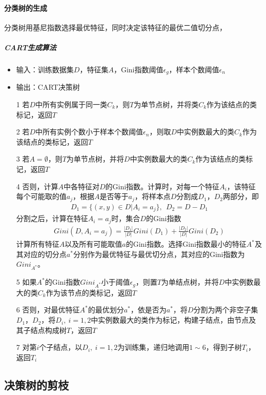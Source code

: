 \paragraph{分类树的生成}

分类树用基尼指数选择最优特征，同时决定该特征的最优二值切分点，
\subparagraph{CART生成算法}
\begin{itemize}
\item 输入：训练数据集$D$，特征集$A$，Gini指数阈值$\epsilon_g$，样本个数阈值$\epsilon_n$
\item 输出：CART决策树
\item[1] 若$D$中所有实例属于同一类$C_k$，则$T$为单节点树，并将类$C_k$作为该结点的类标记，返回$T$
\item[2] 若$D$中所有实例个数小于样本个数阈值$\epsilon_n$，则取$D$中实例数最大的类$C_k$作为该结点的类标记，返回$T$
\item[3] 若$A=\emptyset$，则$T$为单节点树，并将$D$中实例数最大的类$C_k$作为该结点的类标记，返回$T$
\item[4] 否则，计算$A$中各特征对$D$的Gini指数。计算时，对每一个特征$A_i$，该特征每个可能取的值$a_j$，根据$A$是否等于$a_j$，将样本点$D$分割成$D_1$，$D_2$两部分，即
\begin{eqnarray}
D_1=\{ (x,y)\in D|A_i=a_j \},\ \ D_2 = D-D_1
\end{eqnarray}
分割之后，计算在特征$A_i=a_j$时，集合$D$的Gini指数
\begin{eqnarray}
Gini(D,A_i=a_j)=\frac{|D_1|}{|D|}Gini(D_1)+\frac{|D_2|}{|D|}Gini(D_2)
\end{eqnarray}
计算所有特征$A$以及所有可能取值$a$的Gini指数。选择Gini指数最小的特征$A^*$及其对应的切分点$a^*$分别作为最优特征与最优切分点，其对应的Gini指数为$Gini_{A^*}$。
\item[5] 如果$A^*$的Gini指数$Gini_{A^*}$小于阈值$\epsilon_g$，则置$T$为单结点树，并将$D$中实例数最大的类$C_k$作为该节点的类标记，返回$T$
\item[6] 否则，对最优特征$A^*$的最优划分$a^*$，依是否为$a^*$，将$D$分割为两个非空子集$D_1$，$D_2$，将$D_i,\ i=1,2$中实例数最大的类作为标记，构建子结点，由节点及其子结点构成树$T$，返回$T$
\item[7] 对第$i$个子结点，以$D_i,\ i=1,2$为训练集，递归地调用$1\sim 6$，得到子树$T_i$，返回$T_i$
\end{itemize}

\subsection{决策树的剪枝}
